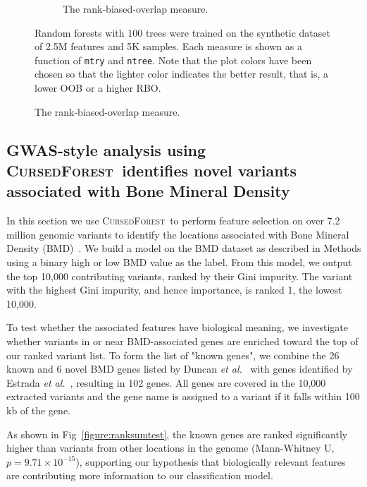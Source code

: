 \documentclass[10pt,letterpaper]{article}
\newcommand{\cursedforest}{\textsc{CursedForest}\xspace}
\newcommand{\mtry}{\texttt{mtry}\xspace}
\newcommand{\ntree}{\texttt{ntree}\xspace}
\begin{document}
\begin{figure}[tbhp]
\begin{adjustwidth}{-1.00in}{0in}
\begin{subfigure}[b]{0.5\linewidth}
      \caption{The rank-biased-overlap measure.} 
      \label{figure:rbo-prod.png} 
    \end{subfigure} 
    \begin{flushleft} 
      Random forests with 100 trees were trained on the synthetic dataset of 2.5M features and 5K samples.
      Each measure is shown as a function of \mtry and \ntree. Note that the plot colors have been chosen so that the lighter color indicates
      the better result, that is, a lower OOB or a higher RBO.
    \end{flushleft}
  \end{adjustwidth}
\end{figure}

\subsection{GWAS-style analysis using \cursedforest\ identifies novel variants associated with Bone Mineral Density}
In this section we use \cursedforest\ to perform feature selection on over 7.2 million genomic variants to identify the
locations associated with Bone Mineral Density (BMD)~\cite{Duncan.2011}. We build a model on the BMD dataset as
described in Methods using a binary high or low BMD value as the label.  From this model, we output the top 10,000
contributing variants, ranked by their Gini impurity. The variant with the highest Gini impurity, and hence importance,
is ranked 1, the lowest 10,000.

To test whether the associated features have biological meaning, we investigate whether variants in or near
BMD-associated genes are enriched toward the top of our ranked variant list. To form the list of "known genes", we
combine the 26 known and 6 novel BMD genes listed by Duncan {\it et al.}~\cite{Duncan.2011} with genes identified by
Estrada {\it et al.}~\cite{Estrada2012, Kemp2014,Phang.2008}, resulting in 102 genes.  All genes are covered in the
10,000 extracted variants and the gene name is assigned to a variant if it falls within 100 kb of the gene.

As shown in Fig~\ref{figure:ranksumtest}, the known genes are ranked significantly higher than variants from other
locations in the genome (Mann-Whitney U, $p=9.71\times10^{-15}$), supporting our hypothesis that biologically relevant
features are contributing more information to our classification model.
\end{document}
